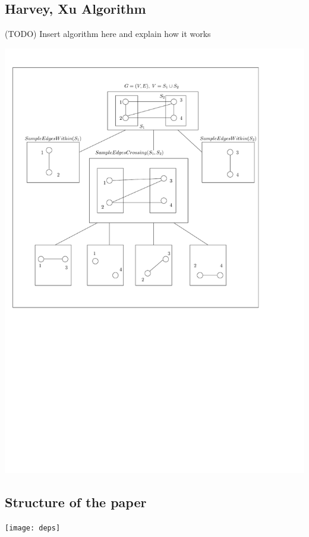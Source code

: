 \subsection{Harvey, Xu Algorithm}

(TODO) Insert algorithm here and explain how it works
\begin{center}
    \includegraphics[scale=0.85]{Figures/alg-tree}
\end{center}



\subsection{Structure of the paper}

\begin{center}
\texttt{[image: deps]} 
\end{center}


